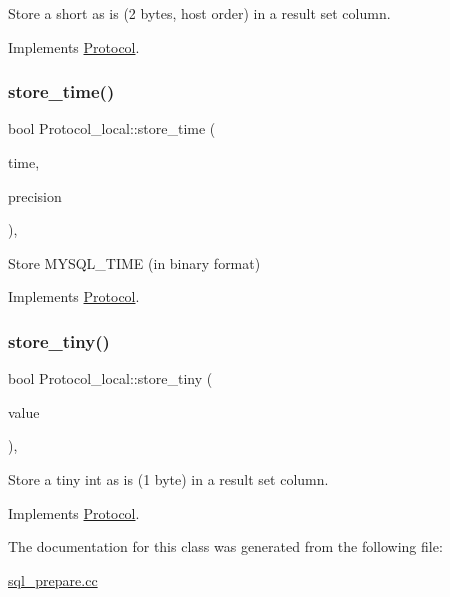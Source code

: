 Store a short as is (2 bytes, host order) in a result set column. 

Implements \mbox{\hyperlink{classProtocol}{Protocol}}.

\mbox{\label{classProtocol__local_a0255894541e58369d2460a497e21c95f}} 
\subsubsection{\texorpdfstring{store\+\_\+time()}{store\_time()}}
{\footnotesize\ttfamily bool Protocol\+\_\+local\+::store\+\_\+time (\begin{DoxyParamCaption}\item[{M\+Y\+S\+Q\+L\+\_\+\+T\+I\+ME $\ast$}]{time,  }\item[{uint}]{precision }\end{DoxyParamCaption})\hspace{0.3cm}{\ttfamily [protected]}, {\ttfamily [virtual]}}

Store M\+Y\+S\+Q\+L\+\_\+\+T\+I\+ME (in binary format) 

Implements \mbox{\hyperlink{classProtocol}{Protocol}}.

\mbox{\label{classProtocol__local_a2fb298b1c00ac82efa31b9d4a04c48cf}} 
\subsubsection{\texorpdfstring{store\+\_\+tiny()}{store\_tiny()}}
{\footnotesize\ttfamily bool Protocol\+\_\+local\+::store\+\_\+tiny (\begin{DoxyParamCaption}\item[{longlong}]{value }\end{DoxyParamCaption})\hspace{0.3cm}{\ttfamily [protected]}, {\ttfamily [virtual]}}

Store a tiny int as is (1 byte) in a result set column. 

Implements \mbox{\hyperlink{classProtocol}{Protocol}}.



The documentation for this class was generated from the following file\+:\begin{DoxyCompactItemize}
\item 
\mbox{\hyperlink{sql__prepare_8cc}{sql\+\_\+prepare.\+cc}}\end{DoxyCompactItemize}
